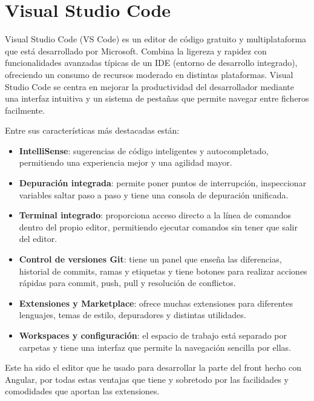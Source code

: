 
\section{Visual Studio Code}\label{visual-studio-code}

Visual Studio Code (VS Code) es un editor de código gratuito y multiplataforma que está desarrollado por Microsoft. Combina la ligereza y rapidez con funcionalidades avanzadas típicas de un IDE (entorno de desarrollo integrado), ofreciendo un consumo de recursos moderado en distintas plataformas. Visual Studio Code se centra en mejorar la productividad del desarrollador mediante una interfaz intuitiva y un sistema de pestañas que permite navegar entre ficheros facilmente.

Entre sus características más destacadas están:
\begin{itemize}
  \item \textbf{IntelliSense}: sugerencias de código inteligentes y autocompletado, permitiendo una experiencia mejor y una agilidad mayor. 
  \item \textbf{Depuración integrada}: permite poner puntos de interrupción, inspeccionar variables saltar paso a paso y tiene una consola de depuración unificada.
  \item \textbf{Terminal integrado}: proporciona acceso directo a la línea de comandos dentro del propio editor, permitiendo ejecutar comandos sin tener que salir del editor.  
  \item \textbf{Control de versiones Git}: tiene un panel que enseña las diferencias, historial de commits, ramas y etiquetas y tiene botones para realizar acciones rápidas para commit, push, pull y resolución de conflictos.  
  \item \textbf{Extensiones y Marketplace}: ofrece muchas extensiones para diferentes lenguajes, temas de estilo, depuradores y distintas utilidades.  
  \item \textbf{Workspaces y configuración}: el espacio de trabajo está separado por carpetas y tiene una interfaz que permite la navegación sencilla por ellas.  
\end{itemize}

Este ha sido el editor que he usado para desarrollar la parte del front hecho con Angular, por todas estas ventajas que tiene y sobretodo por las facilidades y comodidades que aportan las extensiones.


